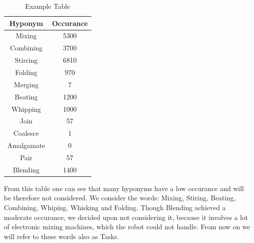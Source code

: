     \begin{table}[H]
        \centering
        \begin{tabular}{|c|c|}
          \hline
          \textbf{Hyponym} & \textbf{Occurance}  \\
          \hline
          Mixing & 5300 \\
          \hline
          Combining & 3700  \\
          \hline
          Stirring & 6810 \\
          \hline
          Folding & 970 \\
          \hline
          Merging & 7 \\
          \hline
          Beating & 1200 \\
          \hline
          Whipping & 1000 \\
          \hline
          Join & 57 \\
          \hline
          Coalesce & 1 \\
          \hline
          Amalgamate & 0 \\
          \hline
          Pair & 57 \\
          \hline
          Blending & 1400 \\
          \hline
    
        \end{tabular}
        \caption{Example Table}
        \label{tab:example}
      \end{table}
      

	From this table one can see that many hyponyms have a low occurance and will be therefore not considered.
	We consider the words: Mixing, Stiring, Beating, Combining, Whiping, Whisking and Folding. Though Blending achieved a moderate occurance, we decided upon not considering it, because it involves a lot of electronic mixing machines, which the robot could not handle.
	From now on we will refer to these words also as Tasks.

